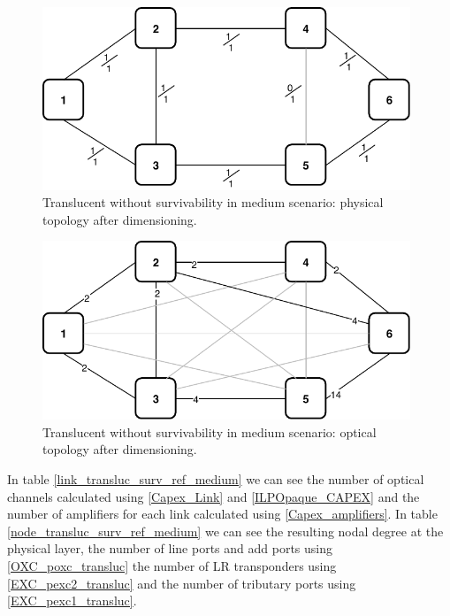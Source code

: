 \begin{figure}[h!]
\centering
\includegraphics[width=11cm]{sdf/ilp/translucent_survivability/figures/physical_topology_medium}
\caption{Translucent without survivability in medium scenario: physical topology after dimensioning.}
\label{physical3_medium}
\end{figure}

\newpage
\begin{figure}[h!]
\centering
\includegraphics[width=11cm]{sdf/ilp/translucent_survivability/figures/optical_topology_medium}
\caption{Translucent without survivability in medium scenario: optical topology after dimensioning.}
\label{optical3_medium}
\end{figure}

In table \ref{link_transluc_surv_ref_medium} we can see the number of optical channels calculated using \ref{Capex_Link} and \ref{ILPOpaque_CAPEX} and the number of amplifiers for each link calculated using \ref{Capex_amplifiers}.
In table \ref{node_transluc_surv_ref_medium} we can see the resulting nodal degree at the physical layer, the number of line ports and add ports using \ref{OXC_poxc_transluc} the number of LR transponders using \ref{EXC_pexc2_transluc} and the number of tributary ports using \ref{EXC_pexc1_transluc}.

